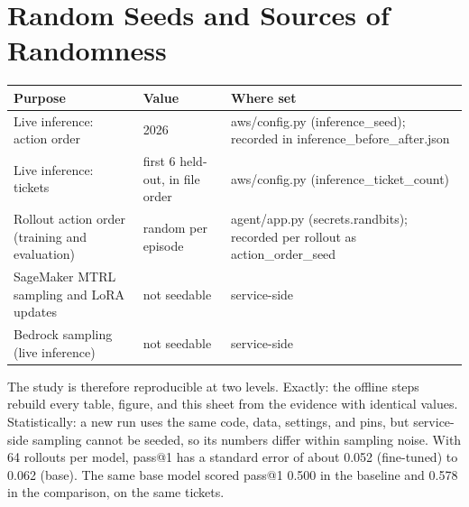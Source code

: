 \documentclass[11pt]{article}
\begin{document}
\section{Random Seeds and Sources of Randomness}
\begin{center}
\begin{minipage}{\linewidth}\centering
\begin{tabular}{P{4.6cm}P{3.6cm}P{6.8cm}}
\toprule
\textbf{Purpose} & \textbf{Value} & \textbf{Where set} \\
\midrule
Live inference: action order & 2026 & aws/config.py (inference\_seed); recorded in inference\_before\_after.json \\
Live inference: tickets & first 6 held-out, in file order & aws/config.py (inference\_ticket\_count) \\
Rollout action order (training and evaluation) & random per episode & agent/app.py (secrets.randbits); recorded per rollout as action\_order\_seed \\
SageMaker MTRL sampling and LoRA updates & not seedable & service-side \\
Bedrock sampling (live inference) & not seedable & service-side \\
\bottomrule
\end{tabular}
\end{minipage}
\end{center}
The study is therefore reproducible at two levels. Exactly: the offline steps rebuild every table, figure,
and this sheet from the evidence with identical values. Statistically: a new run uses the same code, data,
settings, and pins, but service-side sampling cannot be seeded, so its numbers differ within sampling noise.
With 64 rollouts per model, pass@1 has a standard error of about 0.052 (fine-tuned) to 0.062 (base). The same base
model scored pass@1 0.500 in the baseline and 0.578 in the comparison, on
the same tickets.
\end{document}
